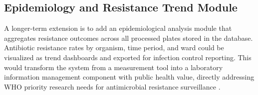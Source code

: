 \subsection{Epidemiology and Resistance Trend Module}

A longer-term extension is to add an epidemiological analysis module
that aggregates resistance outcomes across all processed plates stored in the database.
Antibiotic resistance rates by organism, time period, and ward could be visualized
as trend dashboards and exported for infection control reporting.
This would transform the system from a measurement tool into a
laboratory information management component with public health value,
directly addressing WHO priority research needs for antimicrobial resistance surveillance
\cite{who_amr2022}.
